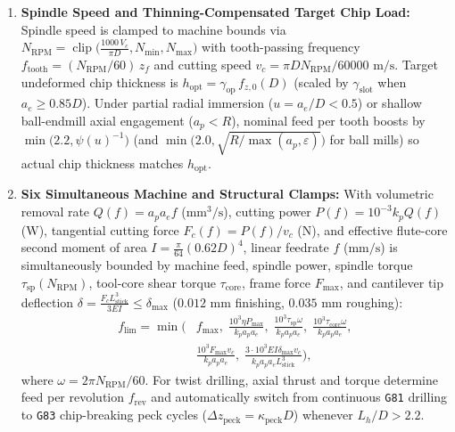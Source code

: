 \documentclass[conference]{IEEEtran}
\begin{document}
\begin{enumerate}
  \item \textbf{Spindle Speed and Thinning-Compensated Target Chip Load:} Spindle speed is clamped to machine bounds via $N_{\text{RPM}} = \operatorname{clip}\!\big(\frac{1000\,V_c}{\pi D}, N_{\min}, N_{\max}\big)$ with tooth-passing frequency $f_{\text{tooth}} = (N_{\text{RPM}}/60)\,z_f$ and cutting speed $v_c = \pi D N_{\text{RPM}} / 60000\text{ m/s}$. Target undeformed chip thickness is $h_{\text{opt}} = \gamma_{\text{op}}\,f_{z,0}(D)$ (scaled by $\gamma_{\text{slot}}$ when $a_e \ge 0.85 D$). Under partial radial immersion ($u = a_e/D < 0.5$) or shallow ball-endmill axial engagement ($a_p < R$), nominal feed per tooth boosts by $\min\!\big(2.2, \psi(u)^{-1}\big)$ (and $\min\!\big(2.0, \sqrt{R/\max(a_p,\varepsilon)}\big)$ for ball mills) so actual chip thickness matches $h_{\text{opt}}$.
  \item \textbf{Six Simultaneous Machine and Structural Clamps:} With volumetric removal rate $Q(f) = a_p a_e f$ ($\text{mm}^3/\text{s}$), cutting power $P(f) = 10^{-3} k_p Q(f)$ ($\text{W}$), tangential cutting force $F_c(f) = P(f) / v_c$ ($\text{N}$), and effective flute-core second moment of area $I = \frac{\pi}{64}(0.62 D)^4$, linear feedrate $f$ ($\text{mm/s}$) is simultaneously bounded by machine feed, spindle power, spindle torque $\tau_{\text{sp}}(N_{\text{RPM}})$, tool-core shear torque $\tau_{\text{core}}$, frame force $F_{\max}$, and cantilever tip deflection $\delta = \frac{F_c L_{\text{stick}}^3}{3 E I} \le \delta_{\max}$ ($0.012\text{ mm}$ finishing, $0.035\text{ mm}$ roughing):
  \begin{equation}
    \begin{aligned}
      f_{\text{lim}} = \min\!\Big(&
        f_{\max},\;
        \frac{10^3 \eta P_{\max}}{k_p a_p a_e},\;
        \frac{10^3 \tau_{\text{sp}}\omega}{k_p a_p a_e},\;
        \frac{10^3 \tau_{\text{core}}\omega}{k_p a_p a_e}, \\
        &\frac{10^3 F_{\max} v_c}{k_p a_p a_e},\;
        \frac{3\cdot 10^3 E I \delta_{\max} v_c}{k_p a_p a_e L_{\text{stick}}^3}
      \Big),
    \end{aligned}
    \label{eq:six_caps}
  \end{equation}
  where $\omega = 2\pi N_{\text{RPM}} / 60$. For twist drilling, axial thrust and torque determine feed per revolution $f_{\text{rev}}$ and automatically switch from continuous \texttt{G81} drilling to \texttt{G83} chip-breaking peck cycles ($\Delta z_{\text{peck}} = \kappa_{\text{peck}} D$) whenever $L_h / D > 2.2$.
\end{enumerate}
\end{document}
